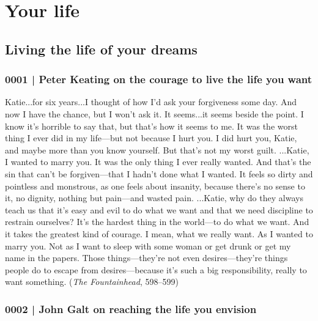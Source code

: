 \section{Your life}
	\label{GM-LIFE}
	
	\subsection{Living the life of your dreams} %
		\label{GM-LIFE-DREAMS}
		
		\subsubsection{0001 | Peter Keating on the courage to live the life you want}
			\label{GM-LIFE-DREAMS-0001}
		
			Katie...for six years...I thought of how I'd ask your forgiveness some day. And now I have the chance, but I won't ask it. It seems...it seems beside the point. I know it's horrible to say that, but that's how it seems to me. It was the worst thing I ever did in my life---but not because I hurt you. I did hurt you, Katie, and maybe more than you know yourself. But that's not my worst guilt. ...Katie, I wanted to marry you. It was the only thing I ever really wanted. And that's the sin that can't be forgiven---that I hadn't done what I wanted. It feels so dirty and pointless and monstrous, as one feels about insanity, because there's no sense to it, no dignity, nothing but pain---and wasted pain. ...Katie, why do they always teach us that it's easy and evil to do what we want and that we need discipline to restrain ourselves? It's the hardest thing in the world---to do what we want. And it takes the greatest kind of courage. I mean, what we really want. As I wanted to marry you. Not as I want to sleep with some woman or get drunk or get my name in the papers. Those things---they're not even desires---they're things people do to escape from desires---because it's such a big responsibility, really to want something. (\textit{The Fountainhead}, 598--599)
			
		\subsubsection{0002 | John Galt on reaching the life you envision}
			\label{GM-LIFE-DREAMS-0002}
		
